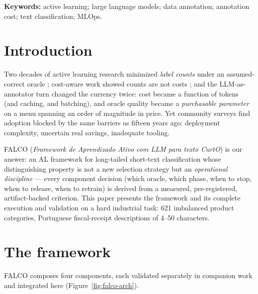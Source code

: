\documentclass[11pt]{article}
\begin{document}
\noindent\textbf{Keywords:} active learning; large language models; data
annotation; annotation cost; text classification; MLOps.

\section{Introduction}
\label{sec:intro}

Two decades of active learning research minimized \emph{label counts}
under an assumed-correct oracle \citep{Settles2012,Olsson2009}; cost-aware
work showed counts are not costs \citep{SettlesCravenFriedland2008}; and
the LLM-as-annotator turn \citep{Gilardi2023,Zhang2025,Rouzegar2024,
Kholodna2024} changed the currency twice: cost became a function of
tokens (and caching, and batching), and oracle quality became a
\emph{purchasable parameter} on a menu spanning an order of magnitude in
price. Yet community surveys \citep{Romberg2025Reassessing} find adoption
blocked by the same barriers as fifteen years ago: deployment complexity,
uncertain real savings, inadequate tooling.

FALCO (\emph{Framework de Aprendizado Ativo com LLM para texto CurtO})
is our answer: an AL framework for long-tailed short-text classification
whose distinguishing property is not a new selection strategy but an
\emph{operational discipline} --- every component decision (which oracle,
which phase, when to stop, when to release, when to retrain) is derived
from a measured, pre-registered, artifact-backed criterion. This paper
presents the framework and its complete execution and validation on a
hard industrial task: 621 imbalanced product categories, Portuguese
fiscal-receipt descriptions of 4--50 characters.

\section{The framework}
\label{sec:framework}

FALCO composes four components, each validated separately in companion
work and integrated here (Figure~\ref{fig:falco-arch}).
\end{document}
